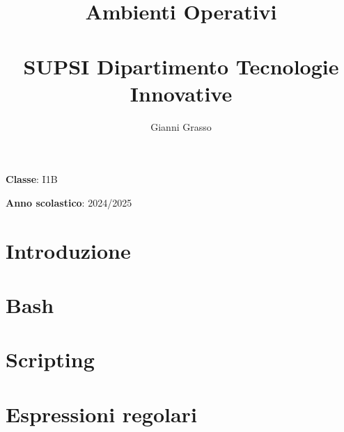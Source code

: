 \documentclass{article}
\title{
    Ambienti Operativi \\
    \phantom{}\\
    \large SUPSI Dipartimento Tecnologie Innovative
}
\author{Gianni Grasso}
\begin{document}
\maketitle
\hphantom{ }
\vspace{14.5cm}

\textbf{Classe}: I1B

\textbf{Anno scolastico}: 2024/2025
\pagebreak


\tableofcontents
\pagebreak

\section{Introduzione}

\pagebreak


\section{Bash}

\pagebreak

\section{Scripting}

\pagebreak

\section{Espressioni regolari}

\pagebreak
\end{document}
